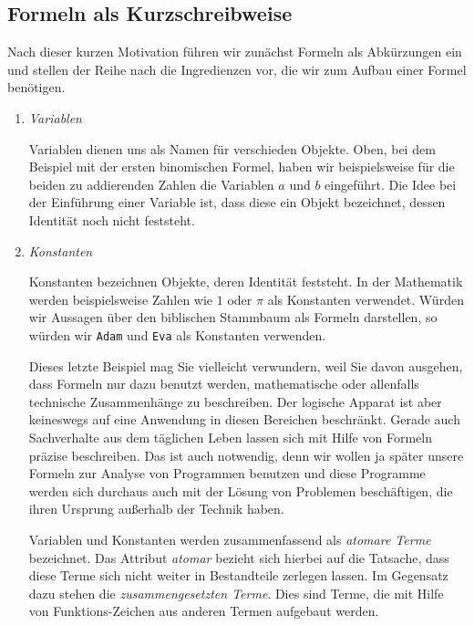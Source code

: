 \subsection{Formeln als Kurzschreibweise}
Nach dieser kurzen Motivation führen wir zunächst Formeln als Abkürzungen ein und stellen
der Reihe nach die Ingredienzen vor, die wir zum Aufbau einer Formel benötigen. 
\begin{enumerate}
\item \emph{Variablen}

      Variablen dienen uns als Namen für verschieden Objekte.  Oben, bei dem Beispiel mit
      der ersten binomischen Formel, haben wir beispielsweise 
      für die beiden zu addierenden Zahlen die Variablen $a$ und $b$ eingeführt.  Die Idee bei
      der Einführung einer Variable ist, dass diese ein Objekt bezeichnet, dessen Identität 
      noch nicht feststeht.
\item \emph{Konstanten}

      Konstanten bezeichnen  Objekte, deren Identität feststeht. 
      In der Mathematik werden beispielsweise Zahlen wie $1$ oder $\pi$ als Konstanten verwendet.
      Würden wir Aussagen über den biblischen Stammbaum als Formeln darstellen, so würden
      wir  \texttt{Adam} und \texttt{Eva} als Konstanten verwenden.

      \begin{center}
      \begin{minipage}{13.4cm}  
        { \footnotesize
          \setlength{\baselineskip}{9pt} 
          Dieses letzte Beispiel mag Sie vielleicht verwundern, weil Sie davon
          ausgehen, dass Formeln nur dazu benutzt werden, mathematische oder allenfalls
          technische Zusammenhänge zu beschreiben.  Der logische Apparat ist aber
          keineswegs auf eine Anwendung in diesen Bereichen beschränkt.  Gerade auch
          Sachverhalte aus dem täglichen Leben lassen sich mit Hilfe von Formeln präzise
          beschreiben.  Das ist auch notwendig, denn wir wollen ja später unsere Formeln
          zur Analyse von Programmen benutzen und diese Programme werden sich durchaus
          auch mit der Lösung von Problemen beschäftigen, die ihren Ursprung außerhalb der
          Technik haben. \par} 
      \end{minipage}
      \end{center}

      Variablen und Konstanten werden zusammenfassend als \emph{atomare Terme}
      bezeichnet.  Das Attribut \emph{atomar} bezieht sich hierbei auf die Tatsache,
      dass diese Terme sich nicht weiter in Bestandteile zerlegen lassen.  Im Gegensatz
      dazu stehen die \emph{zusammengesetzten Terme}.  Dies sind Terme, die mit Hilfe von 
      Funktions-Zeichen aus anderen Termen aufgebaut werden.


\end{enumerate}
